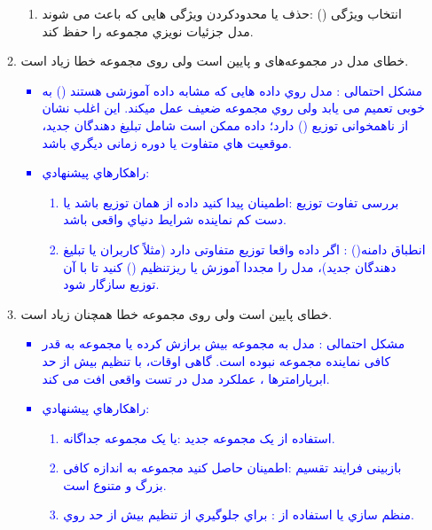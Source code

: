 \documentclass[12pt]{article}
\begin{document}
\begin{enumerate}
\begin{enumerate}
{\begin{itemize}
\begin{enumerate}
{                Stopping}
                \item انتخاب ویژگی () :حذف یا محدودکردن ویژگی هایی که باعث می شوند مدل جزئیات
                نویزي مجموعه  را حفظ کند.
            \end{enumerate}
        \end{itemize}
        }
        \item خطای مدل در مجموعه‌های  و  پایین است ولی روی مجموعه  خطا زیاد است.\\
        \textcolor{blue}{
        \begin{itemize}
            \item مشکل احتمالی : مدل روي داده هایی که مشابه داده آموزشی هستند () به خوبی تعمیم می یابد ولی
            روي مجموعه  ضعیف عمل میکند. این اغلب نشان از ناهمخوانی توزیع ()  دارد؛ داده  ممکن است شامل تبلیغ دهندگان جدید، موقعیت هاي متفاوت یا دوره زمانی دیگري باشد.
            \item راهکارهاي پیشنهادي:\\
            \begin{enumerate}
                \item بررسی تفاوت توزیع :اطمینان پیدا کنید داده  از همان توزیع  باشد یا دست کم نماینده شرایط
                دنیاي واقعی باشد.
                \item انطباق دامنه() : اگر داده  واقعا توزیع متفاوتی دارد (مثلاً کاربران یا
                تبلیغ دهندگان جدید)، مدل را مجددا آموزش یا ریزتنظیم () کنید تا با آن توزیع سازگار شود.
            \end{enumerate}
        \end{itemize}
        }
        \item خطای  پایین است ولی روی مجموعه  خطا همچنان زیاد است.\\
        \textcolor{blue}{
        \begin{itemize}
            \item مشکل احتمالی : مدل به مجموعه  بیش برازش کرده یا مجموعه  به قدر کافی نماینده مجموعه  نبوده
            است. گاهی اوقات، با تنظیم بیش از حد ابرپارامترها  ، عملکرد مدل در تست واقعی افت می کند. 
            \item راهکارهاي پیشنهادي:\\
            \begin{enumerate}
                \item استفاده از یک مجموعه  جدید :یا یک مجموعه  جداگانه.
                \item بازبینی فرایند تقسیم :اطمینان حاصل کنید مجموعه  به اندازه کافی بزرگ و متنوع است.
                \item منظم سازي یا استفاده از  : براي جلوگیري از تنظیم بیش از حد روي.
            \end{enumerate}
        \end{itemize}
        }
    \end{enumerate}
    

\end{enumerate}
\end{document}
